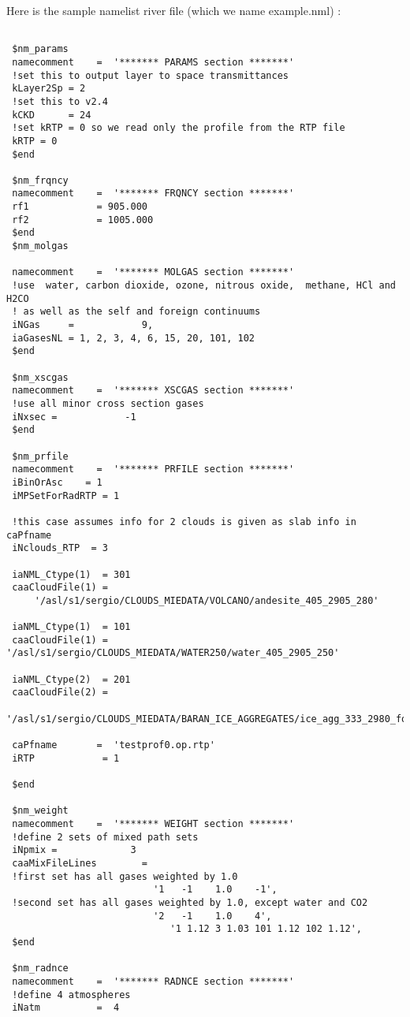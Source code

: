 \documentclass[12pt]{article}
\begin{document}
Here is the sample namelist river file (which we name example.nml) :

\begin{scriptsize}
\begin{verbatim}

 $nm_params
 namecomment    =  '******* PARAMS section *******'
 !set this to output layer to space transmittances
 kLayer2Sp = 2
 !set this to v2.4
 kCKD      = 24
 !set kRTP = 0 so we read only the profile from the RTP file
 kRTP = 0
 $end

 $nm_frqncy
 namecomment    =  '******* FRQNCY section *******'
 rf1            = 905.000
 rf2            = 1005.000
 $end
 $nm_molgas

 namecomment    =  '******* MOLGAS section *******'
 !use  water, carbon dioxide, ozone, nitrous oxide,  methane, HCl and H2CO 
 ! as well as the self and foreign continuums 
 iNGas     =            9,
 iaGasesNL = 1, 2, 3, 4, 6, 15, 20, 101, 102
 $end

 $nm_xscgas
 namecomment    =  '******* XSCGAS section *******'
 !use all minor cross section gases
 iNxsec =            -1
 $end

 $nm_prfile
 namecomment    =  '******* PRFILE section *******'
 iBinOrAsc    = 1
 iMPSetForRadRTP = 1

 !this case assumes info for 2 clouds is given as slab info in caPfname
 iNclouds_RTP  = 3

 iaNML_Ctype(1)  = 301
 caaCloudFile(1) = 
     '/asl/s1/sergio/CLOUDS_MIEDATA/VOLCANO/andesite_405_2905_280'

 iaNML_Ctype(1)  = 101
 caaCloudFile(1) = '/asl/s1/sergio/CLOUDS_MIEDATA/WATER250/water_405_2905_250'

 iaNML_Ctype(2)  = 201
 caaCloudFile(2) = 
  '/asl/s1/sergio/CLOUDS_MIEDATA/BARAN_ICE_AGGREGATES/ice_agg_333_2980_forkcarta'

 caPfname       =  'testprof0.op.rtp'
 iRTP            = 1

 $end

 $nm_weight
 namecomment    =  '******* WEIGHT section *******'
 !define 2 sets of mixed path sets
 iNpmix =             3
 caaMixFileLines        = 
 !first set has all gases weighted by 1.0
                          '1   -1    1.0    -1',
 !second set has all gases weighted by 1.0, except water and CO2
                          '2   -1    1.0    4',
                             '1 1.12 3 1.03 101 1.12 102 1.12',
 $end

 $nm_radnce
 namecomment    =  '******* RADNCE section *******'
 !define 4 atmospheres
 iNatm          =  4


\end{verbatim}
\end{scriptsize}
\end{document}
